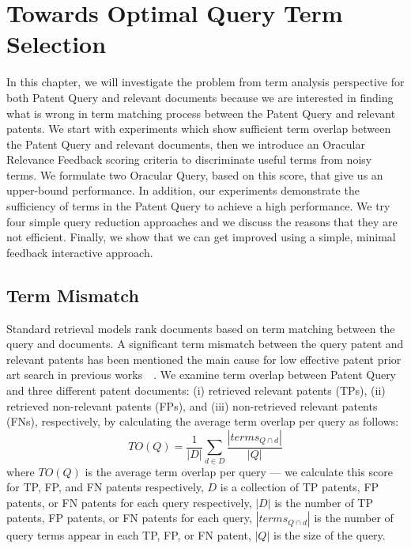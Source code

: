 \chapter{Towards Optimal Query Term Selection}
\label{cha:analysis}
In this chapter, we will investigate the problem from term analysis perspective for both Patent Query and relevant documents because we are interested 
in finding what is wrong in term matching process between the Patent Query and relevant patents. 
We start with experiments which show sufficient term overlap between the Patent Query and relevant documents, 
then we introduce an Oracular Relevance Feedback scoring criteria to discriminate useful terms from noisy terms. 
We formulate two Oracular Query, based on this score, that give us an upper-bound performance. In addition, our experiments demonstrate the sufficiency of terms in the Patent Query to achieve a high performance. 
We try four simple query reduction approaches and we discuss the reasons that they are not efficient.  
Finally, we show that we can get improved using a simple, minimal feedback interactive approach.

\section{Term Mismatch}
\label{sec:termmismatch}
%
Standard retrieval models rank documents based on term matching between the query and documents.  
A significant term mismatch between the query patent and relevant patents has been mentioned the
main cause for low effective patent prior art search in previous works~\citep{roda2010clef}~\citep{magdy2012toward}. 
We examine term overlap between Patent Query and three different patent documents: (i) retrieved relevant patents (TPs), (ii) retrieved non-relevant patents (FPs), and (iii) non-retrieved relevant patents (FNs), respectively, by calculating the average term overlap per query as follows:
\begin{equation} 
TO (Q) = \frac{1}{|D|}\sum_{d\in D}\frac{|terms_{Q\cap d}|}{|Q|}
\label{eq:fntermoverlap}
\end{equation}
where $TO(Q)$ is the average term overlap per query --- we calculate this score for TP, FP, and FN patents respectively, $D$ is a collection of TP patents, FP patents, or FN patents for each query respectively, $|D|$ is the number of TP patents, FP patents, or FN patents for each query, $ |terms_{Q\cap d}| $ is the number of query terms appear in each TP, FP, or FN patent, $ |Q| $ is the size of the query.

